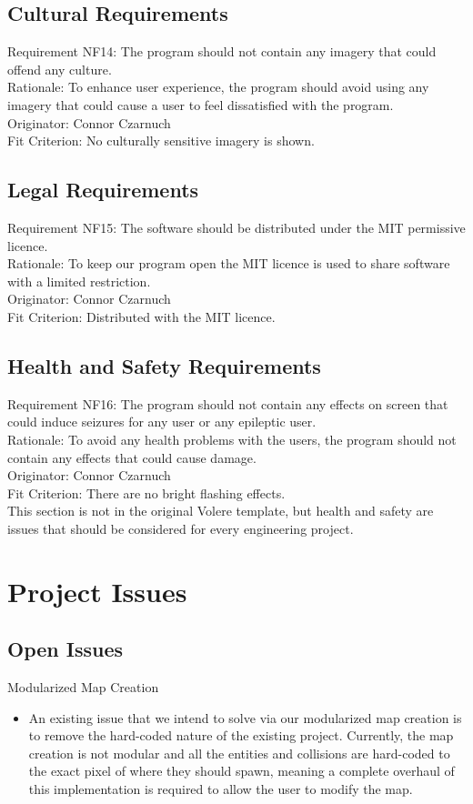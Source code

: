 \documentclass[12pt, titlepage]{article}
\begin{document}
\subsection{Cultural Requirements}

Requirement NF14: The program should not contain any imagery that could offend any culture.\\
Rationale: To enhance user experience, the program should avoid using any imagery that could cause a user to feel dissatisfied with the program.\\
Originator: Connor Czarnuch\\
Fit Criterion: No culturally sensitive imagery is shown.

\subsection{Legal Requirements}

Requirement NF15: The software should be distributed under the MIT permissive licence.\\
Rationale: To keep our program open the MIT licence is used to share software with a limited restriction.\\
Originator: Connor Czarnuch\\
Fit Criterion: Distributed with the MIT licence.

\subsection{Health and Safety Requirements}

Requirement NF16: The program should not contain any effects on screen that could induce seizures for any user or any epileptic user.\\
Rationale: To avoid any health problems with the users, the program should not contain any effects that could cause damage.\\
Originator: Connor Czarnuch\\
Fit Criterion: There are no bright flashing effects.\\

This section is not in the original Volere template, but health and safety are issues that should be considered for every engineering project.

\section{Project Issues}

\subsection{Open Issues}
Modularized Map Creation
\begin{itemize}
\item An existing issue that we intend to solve via our modularized map creation is to remove the hard-coded nature of the existing project. Currently, the map creation is not modular and all the entities and collisions are hard-coded to the exact pixel of where they should spawn, meaning a complete overhaul of this implementation is required to allow the user to modify the map.
\end{itemize}
\end{document}
